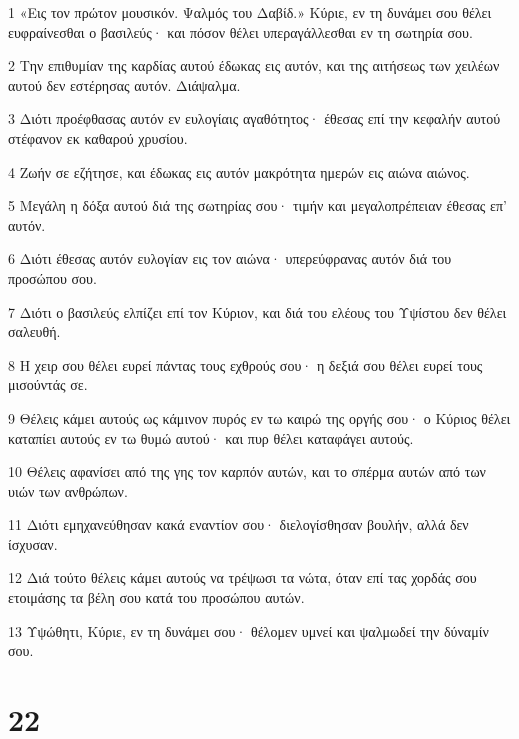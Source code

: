 \par 1 «Εις τον πρώτον μουσικόν. Ψαλμός του Δαβίδ.» Κύριε, εν τη δυνάμει σου θέλει ευφραίνεσθαι ο βασιλεύς· και πόσον θέλει υπεραγάλλεσθαι εν τη σωτηρία σου.
\par 2 Την επιθυμίαν της καρδίας αυτού έδωκας εις αυτόν, και της αιτήσεως των χειλέων αυτού δεν εστέρησας αυτόν. Διάψαλμα.
\par 3 Διότι προέφθασας αυτόν εν ευλογίαις αγαθότητος· έθεσας επί την κεφαλήν αυτού στέφανον εκ καθαρού χρυσίου.
\par 4 Ζωήν σε εζήτησε, και έδωκας εις αυτόν μακρότητα ημερών εις αιώνα αιώνος.
\par 5 Μεγάλη η δόξα αυτού διά της σωτηρίας σου· τιμήν και μεγαλοπρέπειαν έθεσας επ' αυτόν.
\par 6 Διότι έθεσας αυτόν ευλογίαν εις τον αιώνα· υπερεύφρανας αυτόν διά του προσώπου σου.
\par 7 Διότι ο βασιλεύς ελπίζει επί τον Κύριον, και διά του ελέους του Υψίστου δεν θέλει σαλευθή.
\par 8 Η χειρ σου θέλει ευρεί πάντας τους εχθρούς σου· η δεξιά σου θέλει ευρεί τους μισούντάς σε.
\par 9 Θέλεις κάμει αυτούς ως κάμινον πυρός εν τω καιρώ της οργής σου· ο Κύριος θέλει καταπίει αυτούς εν τω θυμώ αυτού· και πυρ θέλει καταφάγει αυτούς.
\par 10 Θέλεις αφανίσει από της γης τον καρπόν αυτών, και το σπέρμα αυτών από των υιών των ανθρώπων.
\par 11 Διότι εμηχανεύθησαν κακά εναντίον σου· διελογίσθησαν βουλήν, αλλά δεν ίσχυσαν.
\par 12 Διά τούτο θέλεις κάμει αυτούς να τρέψωσι τα νώτα, όταν επί τας χορδάς σου ετοιμάσης τα βέλη σου κατά του προσώπου αυτών.
\par 13 Υψώθητι, Κύριε, εν τη δυνάμει σου· θέλομεν υμνεί και ψαλμωδεί την δύναμίν σου.

\chapter{22}

